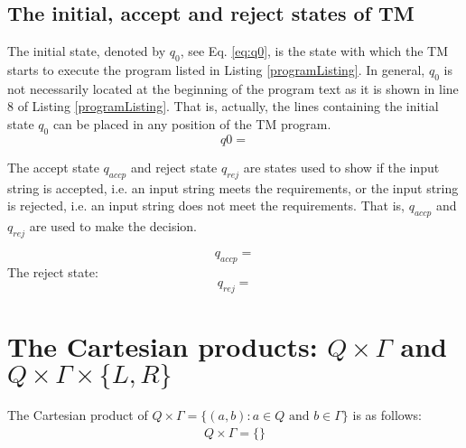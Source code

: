 \documentclass[12pt, a4paper]{report}
\begin{document}
	\subsection{The initial, accept and reject states of TM}
	{The initial state, denoted by $ q_0 $, see Eq. \eqref{eq:q0}, is the state with which the TM starts to execute the program listed in Listing \ref{programListing}. In general, $ q_0 $ is not necessarily located at the beginning of the program text as it is shown in line $ 8 $ of Listing \ref{programListing}. That is, actually, the lines containing the initial state $ q_0 $ can be placed in any position of the TM program.
	\begin{equation} \label{eq:q0}
		q0 = %
	\end{equation}
	
	The accept state $ q_{accp} $ and reject state $ q_{rej} $ are states used to show if the input string is accepted, i.e. an input string meets the requirements, or the input string is rejected, i.e. an input string does not meet the requirements. That is, $ q_{accp} $ and $ q_{rej} $ are used to make the decision. %
	
	\begin{equation}
		q_{accp} = %
	\end{equation}
	{The reject state:}
	\begin{equation}\label{eq:q_rej}
		q_{rej} = %
	\end{equation}
	

	\section{The Cartesian products: $Q \times \Gamma$ and $ Q \times \Gamma \times \{L, R\} $}
	
	The Cartesian product of $Q \times \Gamma = \{(a,b) : a \in Q \text{~and~} b \in \Gamma \}$ is as follows:
		\begin{equation}\label{eq:Q_times_Gamma}
		\begin{aligned}
		Q \times \Gamma = \{
		   \}
		\end{aligned}
		\end{equation}
		
}
\end{document}
